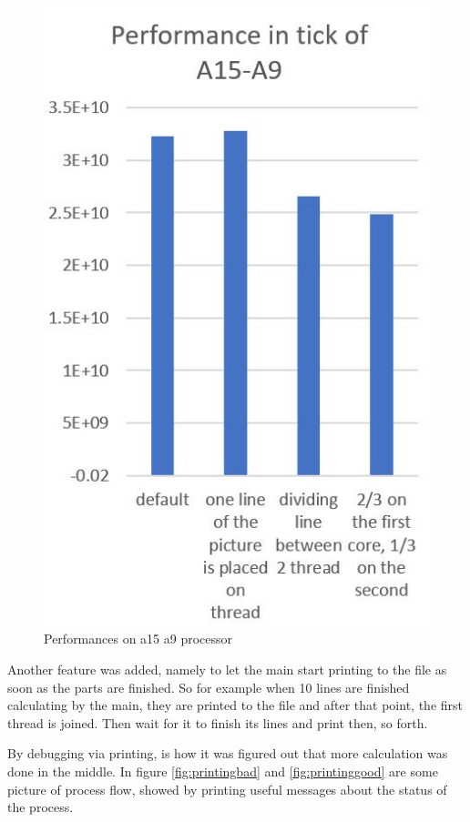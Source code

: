\documentclass[journal]{IEEEtran}
\begin{document}
\begin{figure}[!h]
	\centering
	\includegraphics[width=.8\linewidth]{a15a9}
	\caption{Performances on a15 a9 processor}
	\label{fig:a15a9}
\end{figure}


Another feature was added, namely to let the main start printing to the file as soon as the parts are finished. So for example when 10 lines are finished calculating by the main, they are printed to the file and after that point, the first thread is joined. Then wait for it to finish its lines and print then, so forth.

By debugging via printing, is how it was figured out that more calculation was done in the middle. In figure \ref{fig:printingbad} and \ref{fig:printinggood} are some picture of process flow, showed by printing useful messages about the status of the process. 
\end{document}

